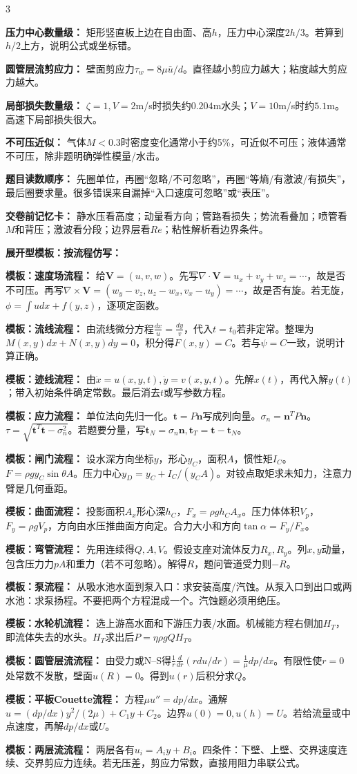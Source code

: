 \documentclass[a4paper]{article}
\newcommand{\sect}[1]{\par{\bfseries\color{Q}#1：}}
\begin{document}
\begin{multicols}{3}
{\sect{压力中心数量级}
矩形竖直板上边在自由面、高$h$，压力中心深度$2h/3$。若算到$h/2$上方，说明公式或坐标错。
\sect{圆管层流剪应力}
壁面剪应力$\tau_w=8\mu\bar u/d$。直径越小剪应力越大；粘度越大剪应力越大。
\sect{局部损失数量级}
$\zeta=1,V=2$m/s时损失约$0.204$m水头；$V=10$m/s时约$5.1$m。高速下局部损失很大。
\sect{不可压近似}
气体$M<0.3$时密度变化通常小于约5\%，可近似不可压；液体通常不可压，除非题明确弹性模量/水击。
\sect{题目读数顺序}
先圈单位，再圈“忽略/不可忽略”，再圈“等熵/有激波/有损失”，最后圈要求量。很多错误来自漏掉“入口速度可忽略”或“表压”。
\sect{交卷前记忆卡}
静水压看高度；动量看方向；管路看损失；势流看叠加；喷管看$M$和背压；激波看分段；边界层看$Re$；粘性解析看边界条件。

\sect{展开型模板：按流程仿写}
\sect{模板：速度场流程}
给$\bm V=(u,v,w)$。先写$\nabla\cdot\bm V=u_x+v_y+w_z=\cdots$，故是否不可压。再写$\nabla\times\bm V=(w_y-v_z,u_z-w_x,v_x-u_y)=\cdots$，故是否有旋。若无旋，$\phi=\int u dx+f(y,z)$，逐项定函数。
\sect{模板：流线流程}
由流线微分方程$\frac{dx}{u}=\frac{dy}{v}$，代入$t=t_0$若非定常。整理为$M(x,y)dx+N(x,y)dy=0$，积分得$F(x,y)=C$。若与$\psi=C$一致，说明计算正确。
\sect{模板：迹线流程}
由$\dot x=u(x,y,t),\dot y=v(x,y,t)$。先解$x(t)$，再代入解$y(t)$；带入初始条件确定常数。最后消去$t$或写参数方程。
\sect{模板：应力流程}
单位法向先归一化。$\bm t=P\bm n$写成列向量。$\sigma_n=\bm n^T P\bm n$。$\tau=\sqrt{\bm t^T\bm t-\sigma_n^2}$。若题要分量，写$\bm t_N=\sigma_n\bm n,\bm t_T=\bm t-\bm t_N$。
\sect{模板：闸门流程}
设水深方向坐标$y$，形心$y_C$，面积$A$，惯性矩$I_C$。$F=\rho g y_C\sin\theta A$。压力中心$y_D=y_C+I_C/(y_CA)$。对铰点取矩求未知力，注意力臂是几何垂距。
\sect{模板：曲面流程}
投影面积$A_x$形心深$h_C$，$F_x=\rho gh_CA_x$。压力体体积$V_p$，$F_y=\rho gV_p$，方向由水压推曲面方向定。合力大小和方向$\tan\alpha=F_y/F_x$。
\sect{模板：弯管流程}
先用连续得$Q,A,V$。假设支座对流体反力$R_x,R_y$。列$x,y$动量，包含压力力$pA$和重力（若不可忽略）。解得$R$，题问管道受力则$-R$。
\sect{模板：泵流程}
从吸水池水面到泵入口：求安装高度/汽蚀。从泵入口到出口或两水池：求泵扬程。不要把两个方程混成一个。汽蚀题必须用绝压。
\sect{模板：水轮机流程}
选上游高水面和下游压力表/水面。机械能方程右侧加$H_T$，即流体失去的水头。$H_T$求出后$P=\eta\rho gQH_T$。
\sect{模板：圆管层流流程}
由受力或N--S得$\frac1r\frac{d}{dr}(rdu/dr)=\frac1\mu dp/dx$。有限性使$r=0$处常数不发散，壁面$u(R)=0$。得到$u(r)$后积分求$Q$。
\sect{模板：平板Couette流程}
方程$\mu u''=dp/dx$。通解$u=(dp/dx)y^2/(2\mu)+C_1y+C_2$。边界$u(0)=0,u(h)=U$。若给流量或中点速度，再解$dp/dx$或$U$。
\sect{模板：两层流流程}
两层各有$u_i=A_iy+B_i$。四条件：下壁、上壁、交界速度连续、交界剪应力连续。若无压差，剪应力常数，直接用阻力串联公式。
}
\end{multicols}
\end{document}
